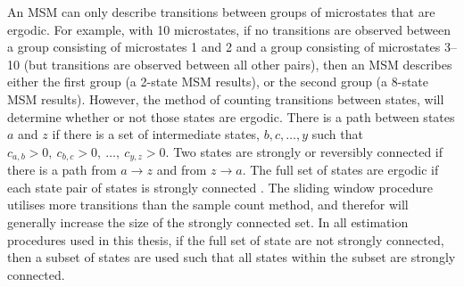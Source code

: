 An MSM can only describe transitions between groups of microstates that are ergodic. For example, with \num{10} microstates, if no transitions are observed between a group consisting of microstates \num{1} and \num{2} and a group consisting of microstates \numrange[range-phrase=\text{--}]{3}{10} (but transitions are observed between all other pairs), then an MSM describes either the first group (a 2-state MSM results), or the second group (a 8-state MSM results).  However, the method of counting transitions between states, will determine whether or not those states are ergodic. There is a path between states $a$ and $z$ if there is a set of intermediate states, $b, c, \ldots, y$ such that $c_{a,b}>0,\ c_{b, c}>0,\ \ldots,\ c_{y, z}>0$. Two states are strongly or reversibly connected if there is a path from $a\rightarrow z$ and from $z\rightarrow a$. The full set of states are ergodic if each state pair of states is strongly connected \cite{wilson1996introduction}. The sliding window procedure utilises more transitions than the sample count method, and therefor will generally increase the size of the strongly connected set. In all estimation procedures used in this thesis, if the full set of state are not strongly connected, then a subset of states are used such that all states within the subset are strongly connected.

